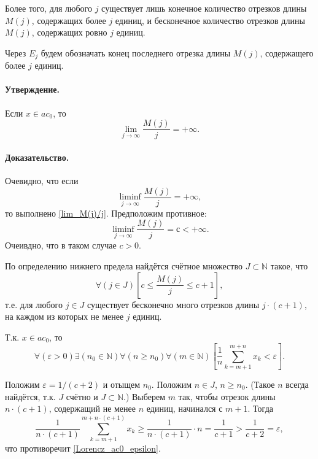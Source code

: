 \documentclass[a4paper,12pt,openbib]{report}
\begin{document}
Более того, для любого $j$ существует лишь конечное количество отрезков длины $M(j)$,
содержащих более $j$ единиц,
и бесконечное количество отрезков длины $M(j)$,
содержащих ровно $j$ единиц.

Через $E_j$ будем обозначать конец последнего отрезка длины $M(j)$,
содержащего более $j$ единиц.

\paragraph{Утверждение.}
Если $x \in ac_0$, то
\begin{equation}\label{lim_M(j)/j}
	\lim_{j \to \infty} \frac{M(j)}{j} = +\infty
	.
\end{equation}

\paragraph{Доказательство.}
Очевидно, что если
\begin{equation}
	\liminf_{j \to \infty} \frac{M(j)}{j} = +\infty
	,
\end{equation}
то выполнено \eqref{lim_M(j)/j}.
Предположим противное:
\begin{equation}
	\liminf_{j \to \infty} \frac{M(j)}{j} = с < +\infty
	.
\end{equation}
Очеивдно, что в таком случае $c>0$.

По определению нижнего предела найдётся счётное множество
$J\subset\mathbb{N}$ такое, что
\begin{equation}
	\forall(j\in J)\left[c \leq \frac{M(j)}{j} \leq c+1 \right],
\end{equation}
т.е. для любого $j\in J$ существует бесконечно много отрезков длины $j\cdot(c+1)$,
на каждом из которых не менее $j$ единиц.

Т.к. $x\in ac_0$, то
\begin{equation}\label{Lorencz_ac0_epsilon}
	\forall(\varepsilon>0)
	\exists(n_0\in\mathbb{N})
	\forall(n \geq n_0)
	\forall(m\in\mathbb{N})
	\left[
		\frac{1}{n} \sum_{k=m+1}^{m+n}x_k < \varepsilon
	\right]
	.
\end{equation}

Положим $\varepsilon = 1/(c+2)$ и отыщем $n_0$.
Положим $n\in J$, $n\geq n_0$.
(Такое $n$ всегда найдётся, т.к. $J$ счётно и $J\subset\mathbb{N}$.)
Выберем $m$ так, чтобы отрезок длины $n\cdot(c+1)$,
содержащий не менее $n$ единиц,
начинался с $m+1$.
Тогда
\begin{equation}
	\frac{1}{n\cdot(c+1)}\sum_{k=m+1}^{m+n\cdot(c+1)}x_k
	\geq
	\frac{1}{n\cdot(c+1)} \cdot n
	=
	\frac{1}{c+1}
	>
	\frac{1}{c+2}
	=
	\varepsilon,
\end{equation}
что противоречит \eqref{Lorencz_ac0_epsilon}.
\end{document}
